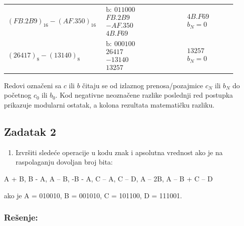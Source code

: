 \documentclass[a4paper,11pt]{article}
\numberwithin{equation}{section}
\newcommand{\redlinija}{\arrayrulecolor{black!28}\specialrule{0.3pt}{2pt}{2pt}\arrayrulecolor{black}}
\begin{document}
\begin{longtable}{p{0.33\linewidth} p{0.36\linewidth} p{0.23\linewidth}}
\redlinija
$(FB.2B9)_{16}-(AF.350)_{16}$ & $\begin{array}{r}\text{b}:\ 011000\\FB.2B9\\-AF.350\\\hline 4B.F69\end{array}$ & $\begin{array}{r}4B.F69\\b_{N}=0\end{array}$\\[5pt]
\redlinija
$(26417)_{8}-(13140)_{8}$ & $\begin{array}{r}\text{b}:\ 000100\\26417\\-13140\\\hline 13257\end{array}$ & $\begin{array}{r}13257\\b_{N}=0\end{array}$\\[5pt]
\bottomrule\end{longtable}

Redovi označeni sa $c$ ili $b$ čitaju se od izlaznog prenosa/pozajmice $c_N$ ili $b_N$ do početnog $c_0$ ili $b_0$. Kod negativne neoznačene razlike poslednji red postupka prikazuje modularni ostatak, a kolona rezultata matematičku razliku.\par

\FloatBarrier
\subsection{Zadatak 2}\label{sec:2.2}


\begin{enumerate}[label=\alph*),start=1,leftmargin=*]
\item Izvršiti sledeće operacije u kodu znak i apsolutna vrednost ako je na raspolaganju dovoljan broj bita:

\end{enumerate}


A + B, B - A, A – B, -B - A, C – A, C – D, A – 2B, A – B + C – D



ako je A = 010010, B = 001010, C = 101100, D = 111001.



\subsubsection*{Rešenje:}
\end{document}
